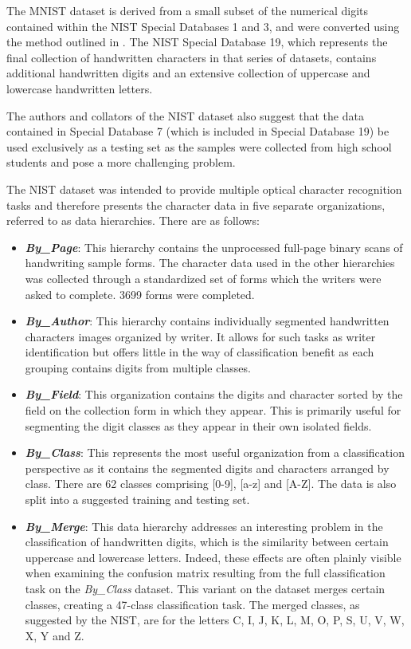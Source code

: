 \documentclass[conference]{IEEEtran}
\begin{document}
The MNIST dataset is derived from a small subset of the numerical digits contained within the NIST Special Databases 1 and 3, and were converted using the method outlined in \cite{LeCun1998}. The NIST Special Database 19, which represents the final collection of handwritten characters in that series of datasets, contains additional handwritten digits and an extensive collection of uppercase and lowercase handwritten letters. 

The authors and collators of the NIST dataset also suggest that the data contained in Special Database 7 (which is included in Special Database 19) be used exclusively as a testing set as the samples were collected from high school students and pose a more challenging problem. 

The NIST dataset was intended to provide multiple optical character recognition tasks and therefore presents the character data in five separate organizations, referred to as data hierarchies. There are as follows:

\begin{itemize}
\item \textbf{\textit{By\_Page}}: This hierarchy contains the unprocessed full-page binary scans of handwriting sample forms. The character data used in the other hierarchies was collected through a standardized set of forms which the writers were asked to complete. 3699 forms were completed.
\item \textbf{\textit{By\_Author}}: This hierarchy contains individually segmented handwritten characters images organized by writer. It allows for such tasks as writer identification but offers little in the way of classification benefit as each grouping contains digits from multiple classes.
\item \textbf{\textit{By\_Field}}: This organization contains the digits and character sorted by the field on the collection form in which they appear. This is primarily useful for segmenting the digit classes as they appear in their own isolated fields.
\item \textbf{\textit{By\_Class}}: This represents the most useful organization from a classification perspective as it contains the segmented digits and characters arranged by class. There are 62 classes comprising [0-9], [a-z] and [A-Z]. The data is also split into a suggested training and testing set. 
\item \textbf{\textit{By\_Merge}}: This data hierarchy addresses an interesting problem in the classification of handwritten digits, which is the similarity between certain uppercase and lowercase letters. Indeed, these effects are often plainly visible when examining the confusion matrix resulting from the full classification task on the \textit{By\_Class} dataset. This variant on the dataset merges certain classes, creating a 47-class classification task. The merged classes, as suggested by the NIST, are for the letters C, I, J, K, L, M, O, P, S, U, V, W, X, Y and Z.
\end{itemize}
\end{document}
